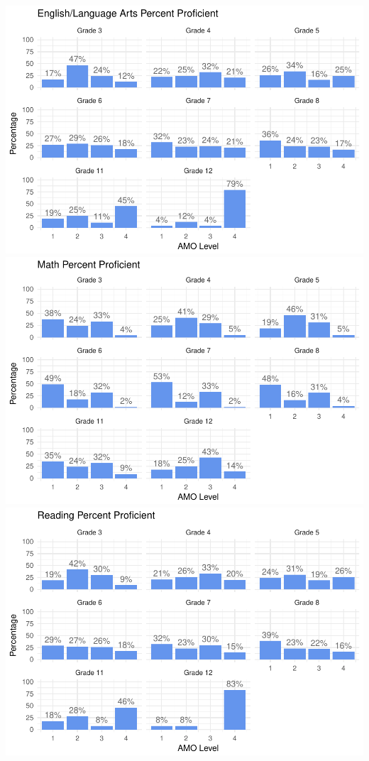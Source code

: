 \documentclass[]{article}
\begin{document}
\includegraphics{tech_report_18_files/figure-latex/amo_plot-1.pdf}
\includegraphics{tech_report_18_files/figure-latex/amo_plot-2.pdf}
\includegraphics{tech_report_18_files/figure-latex/amo_plot-3.pdf}
\end{document}
